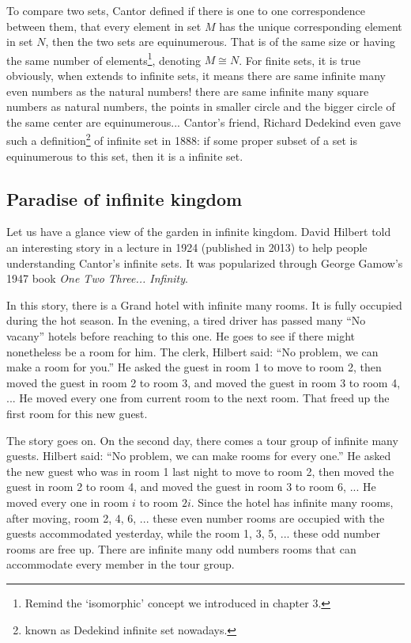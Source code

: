 \documentclass{article}
\begin{document}
To compare two sets, Cantor defined if there is one to one correspondence between them, that every element in set $M$ has the unique corresponding element in set $N$, then the two sets are equinumerous. That is of the same size or having the same number of elements\footnote{Remind the `isomorphic' concept we introduced in chapter 3.}, denoting $M \cong N$. For finite sets, it is true obviously, when extends to infinite sets, it means there are same infinite many even numbers as the natural numbers! there are same infinite many square numbers as natural numbers, the points in smaller circle and the bigger circle of the same center are equinumerous... Cantor's friend, Richard Dedekind even gave such a definition\footnote{known as Dedekind infinite set nowadays.} of infinite set in 1888: if some proper subset of a set is equinumerous to this set, then it is a infinite set.


\subsection{Paradise of infinite kingdom}

Let us have a glance view of the garden in infinite kingdom. David Hilbert told an interesting story in a lecture in 1924 (published in 2013) to help people understanding Cantor's infinite sets. It was popularized through George Gamow's 1947 book {\em One Two Three... Infinity}.

In this story, there is a Grand hotel with infinite many rooms. It is fully occupied during the hot season. In the evening, a tired driver has passed many ``No vacany'' hotels before reaching to this one. He goes to see if there might nonetheless be a room for him. The clerk, Hilbert said: ``No problem, we can make a room for you.'' He asked the guest in room 1 to move to room 2, then moved the guest in room 2 to room 3, and moved the guest in room 3 to room 4, ... He moved every one from current room to the next room. That freed up the first room for this new guest.

The story goes on. On the second day, there comes a tour group of infinite many guests. Hilbert said: ``No problem, we can make rooms for every one.'' He asked the new guest who was in room 1 last night to move to room 2, then moved the guest in room 2 to room 4, and moved the guest in room 3 to room 6, ... He moved every one in room $i$ to room $2i$. Since the hotel has infinite many rooms, after moving, room 2, 4, 6, ... these even number rooms are occupied with the guests accommodated yesterday, while the room 1, 3, 5, ... these odd number rooms are free up. There are infinite many odd numbers rooms that can accommodate every member in the tour group.
\end{document}
